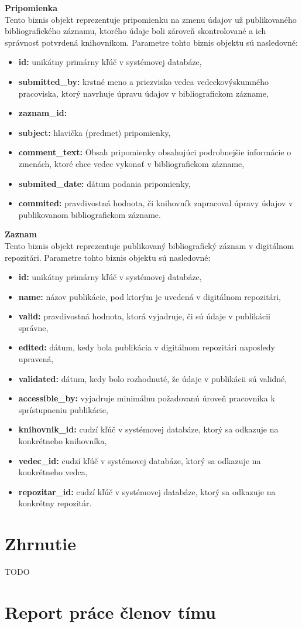 \documentclass[10pt,oneside,slovak,a4paper]{article}
\begin{document}
\textbf{Pripomienka}\\
Tento biznis objekt reprezentuje pripomienku na zmenu údajov už publikovaného bibliografického záznamu, ktorého údaje boli zároveň skontrolované a ich správnosť potvrdená knihovníkom. Parametre tohto biznis objektu sú nasledovné:

\begin{itemize}
\item \textbf{id:} unikátny primárny kľúč v systémovej databáze,
\item \textbf{submitted\_by:} krstné meno a priezvisko vedca vedeckovýskumného pracoviska, ktorý navrhuje úpravu údajov v bibliografickom zázname,
\item \textbf{zaznam\_id:} 
\item \textbf{subject:} hlavička (predmet) pripomienky,
\item \textbf{comment\_text:} Obsah pripomienky obsahujúci podrobnejšie informácie o zmenách, ktoré chce vedec vykonať v bibliografickom zázname,
\item \textbf{submited\_date:} dátum podania pripomienky,
\item \textbf{commited:} pravdivostná hodnota, či knihovník zapracoval úpravy údajov v publikovanom bibliografickom zázname.
\end{itemize}

\textbf{Zaznam}\\
Tento biznis objekt reprezentuje publikovaný bibliografický záznam v digitálnom repozitári. Parametre tohto biznis objektu sú nasledovné:

\begin{itemize}
\item \textbf{id:} unikátny primárny kľúč v systémovej databáze,
\item \textbf{name:} názov publikácie, pod ktorým je uvedená v digitálnom repozitári,
\item \textbf{valid:} pravdivostná hodnota, ktorá vyjadruje, či sú údaje v publikácii správne,
\item \textbf{edited:} dátum, kedy bola publikácia v digitálnom repozitári naposledy upravená,
\item \textbf{validated:} dátum, kedy bolo rozhodnuté, že údaje v publikácii sú validné,
\item \textbf{accessible\_by:} vyjadruje minimálnu požadovanú úroveň pracovníka k sprístupneniu publikácie,
\item \textbf{knihovnik\_id:} cudzí kľúč v systémovej databáze, ktorý sa odkazuje na konkrétneho knihovníka,
\item \textbf{vedec\_id:} cudzí kľúč v systémovej databáze, ktorý sa odkazuje na konkrétneho vedca,
\item \textbf{repozitar\_id:} cudzí kľúč v systémovej databáze, ktorý sa odkazuje na konkrétny repozitár.

\end{itemize}

\section{Zhrnutie}
TODO

\section{Report práce členov tímu}
\end{document}
